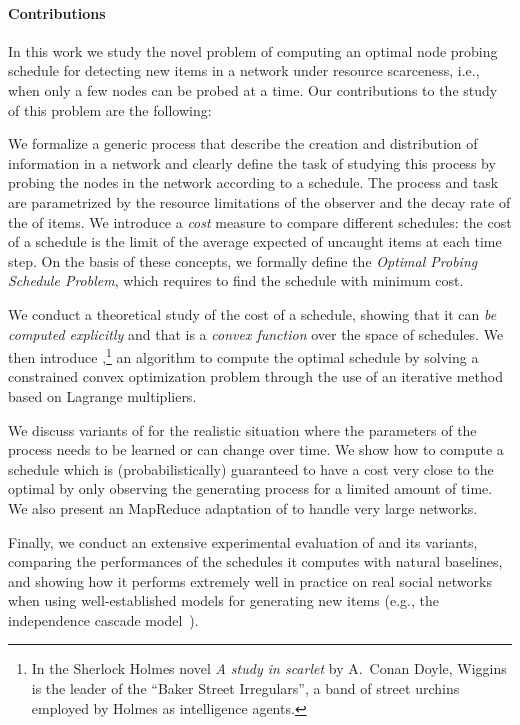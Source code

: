 \paragraph*{Contributions}
In this work we study the novel problem of computing an optimal node probing
schedule for detecting new items in a network under resource scarceness, i.e.,
when only a few nodes can be probed at a time. Our contributions to the study of
this problem are the following:

\begin{itemize*}
	\item We formalize a generic process that describe the creation and
		distribution of information in a network and clearly define the task of
		studying this process by probing the nodes in the network according to a
		schedule. The process and task are parametrized by the resource
		limitations of the observer and the decay rate of the  of
		items. We introduce a \emph{cost} measure to compare different
		schedules: the cost of a schedule is the limit of the average expected
		 of uncaught items at each time step. On the basis of
		these concepts,  we formally define the \emph{Optimal Probing Schedule
		Problem}, which requires to find the schedule with minimum cost.
	\item We conduct a theoretical study of the cost of a schedule, showing that
		it can \emph{be computed explicitly} and that is a \emph{convex
		function} over the space of schedules. We then introduce
		\algoname,\footnote{In the Sherlock Holmes novel \emph{A study in
		scarlet} by A.~Conan Doyle, Wiggins is the leader of the ``Baker Street
		Irregulars'', a band of street urchins employed by Holmes as
		intelligence agents.} an algorithm to compute the optimal schedule by
		solving a constrained convex optimization problem through the use of an
		iterative method based on Lagrange multipliers.
	\item We discuss variants of \algoname for the realistic situation where
		the parameters of the process needs to be learned or can change over
		time. We show how to compute a schedule which is (probabilistically)
		guaranteed to have a cost very close to the optimal by only observing
		the generating process for a limited amount of time. We also present an
		MapReduce adaptation of \algoname to handle very large networks.
	\item Finally, we conduct an extensive experimental evaluation of \algoname
		and its variants, comparing the performances of the schedules it
		computes with natural baselines, and showing how it performs extremely
		well in practice on real social networks when using well-established
		models for generating new items (e.g., the independence cascade
		model~\citep{Kempe2003}).
\end{itemize*}

